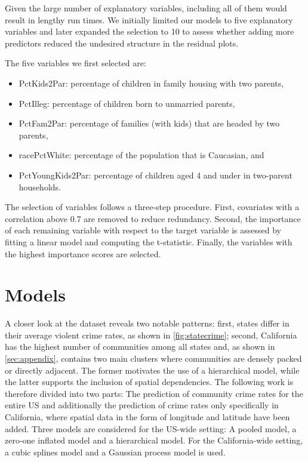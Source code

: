 \documentclass[12pt]{article}
\begin{document}
Given the large number of explanatory variables, including all of them would result in lengthy run times. We initially limited our models to five explanatory variables and later expanded the selection to 10 to assess whether adding more predictors reduced the undesired structure in the residual plots. 

The five variables we first selected are:
\begin{itemize}
    \item PctKids2Par: percentage of children in family housing with two parents,
    \item PctIlleg: percentage of children born to unmarried parents,
    \item PctFam2Par: percentage of families (with kids) that are headed by two parents,
    \item racePctWhite: percentage of the population that is Caucasian, and
    \item PctYoungKids2Par: percentage of children aged 4 and under in two-parent households.
\end{itemize}

The selection of variables follows a three-step procedure. First, covariates with a correlation above 0.7 are removed to reduce redundancy. Second, the importance of each remaining variable with respect to the target variable is assessed by fitting a linear model and computing the t-statistic. Finally, the variables with the highest importance scores are selected.

\section{Models}

A closer look at the dataset reveals two notable patterns: first, states differ in their average violent crime rates, as shown in \autoref{fig:statecrime}; second, California has the highest number of communities among all states and, as shown in \autoref{sec:appendix}, contains two main clusters where communities are densely packed or directly adjacent. The former motivates the use of a hierarchical model, while the latter supports the inclusion of spatial dependencies.
The following work is therefore divided into two parts: The prediction of community crime rates for the entire US and additionally the prediction of crime rates only specifically in California, where spatial data in the form of longitude and latitude have been added. 
Three models are considered for the US-wide setting: A pooled model, a zero-one inflated model and a hierarchical model. For the California-wide setting, a cubic splines model and a Gaussian process model is used. 
\end{document}

